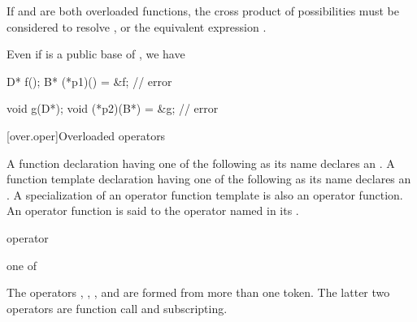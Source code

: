\pnum
\begin{note}
If
and
are both overloaded functions, the
cross product of possibilities must be considered
to resolve
,
or the equivalent expression
.
\end{note}

\pnum
{}%
\begin{note}
Even if  is a public base of ,
we have
\begin{codeblock}
D* f();
B* (*p1)() = &f;                // error

void g(D*);
void (*p2)(B*) = &g;            // error
\end{codeblock}
\end{note}

[over.oper]{Overloaded operators}%
%
%

\pnum
{}%
A function declaration having one of the following
as its name declares an
.
A function template declaration having one of the
following  as its name
declares an . A specialization
of an operator function template is also an operator function.
An operator function is said to
the operator named in its
.

\begin{bnf}
\br
     operator
\end{bnf}

\begin{bnf}
\obeyspaces
{} \textnormal{one of}\br
    \br
    \terminal{\~        !        +        -        *        /        \%        \caret{}        \&}\br
    \terminal{|        =        +=       -=       *=       /=       \%=       \caret{}=       \&=}\br
    \terminal{|=       ==       !=       <        >        <=       >=       <=>      \&\&}\br
    \terminal{||       <<       >>       <<=      >>=      ++       --       ,}\br
\end{bnf}
\begin{note}
The operators
,
,
\tcode{()},
and
\tcode{[]}
are formed from more than one token.
The latter two operators are function call
and subscripting.
\end{note}
%
%


